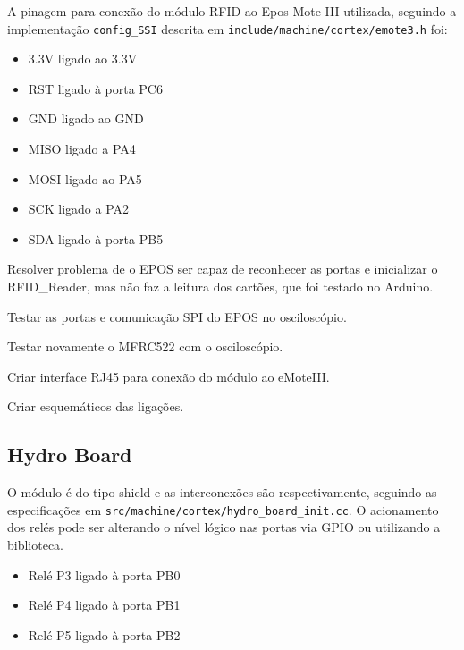 \documentclass[11pt]{article}
\begin{document}
\begin{center}
\scalebox{.8}{}
\end{center}

A pinagem para conexão do módulo RFID ao Epos Mote III utilizada, seguindo a implementação \texttt{config\_SSI} descrita em \texttt{include/machine/cortex/emote3.h} foi:

\begin{itemize}
\item 3.3V ligado ao 3.3V
\item RST ligado à porta PC6
\item GND ligado ao GND
\item MISO ligado a PA4
\item MOSI ligado ao PA5
\item SCK ligado a PA2
\item SDA ligado à porta PB5
\end{itemize}


\begin{todobox}
\begin{todolist}
\item[\done] Resolver problema de o EPOS ser capaz de reconhecer as portas e inicializar o RFID\_Reader, mas não faz a leitura dos cartões, que foi testado no Arduino.
\item[\done] Testar as portas e comunicação SPI do EPOS no osciloscópio.
\item[\done] Testar novamente o MFRC522 com o osciloscópio.
\item Criar interface RJ45 para conexão do módulo ao eMoteIII.
\item[\done] Criar esquemáticos das ligações.
\end{todolist}
\end{todobox}

\subsection{Hydro Board}

O módulo é do tipo shield e as interconexões são respectivamente, seguindo as especificações em \texttt{src/machine/cortex/hydro\_board\_init.cc}. O acionamento dos relés pode ser alterando o nível lógico nas portas via GPIO ou utilizando a biblioteca.

\begin{itemize}
\item Relé P3 ligado à porta PB0
\item Relé P4 ligado à porta PB1
\item Relé P5 ligado à porta PB2
\end{itemize}
\end{document}

